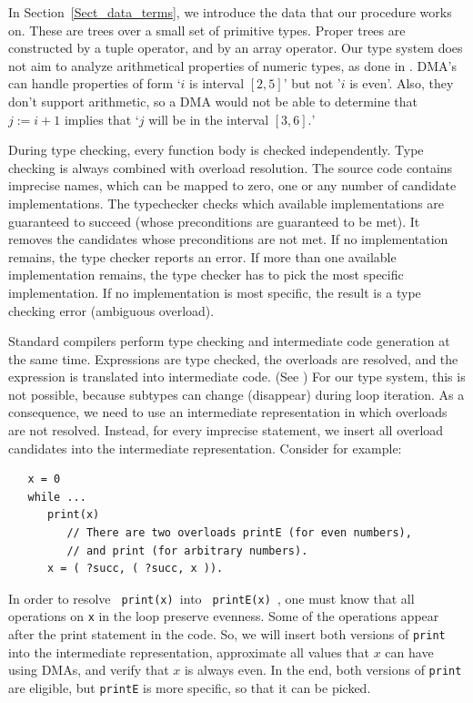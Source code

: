 In Section~\ref{Sect_data_terms}, we introduce the data 
that our procedure works on. These are trees over a small
set of primitive types. Proper trees are constructed by a tuple
operator, and by an array operator. 
Our type system does not aim to analyze arithmetical properties
of numeric types, as done in \cite{JhaVaz2021ref}. 
DMA's can handle properties of form `$i$ is interval $ [2,5] $'
but not '$i$ is even'. Also, they don't support arithmetic,
so a DMA would not be able to determine that $ j := i + 1 $ 
implies that `$j$ will be in the interval $ [3,6]. $' 

During type checking, every function body is checked independently.
Type checking is always combined with overload resolution. 
The source code contains imprecise names, which can be mapped
to zero, one or any number of candidate implementations.
The typechecker checks which available implementations are 
guaranteed to succeed (whose preconditions are guaranteed to be met).
It removes the candidates whose preconditions are not met. 
If no implementation remains, the type checker reports an error. 
If more than one available implementation remains, the type checker
has to pick the most specific implementation. If no implementation
is most specific, the result is a type checking error (ambiguous overload).

Standard compilers perform type checking and intermediate code generation
at the same time.
Expressions are type checked, the overloads are resolved, and the 
expression is translated into intermediate code. 
(See \cite{WiSe2023})
For our type system, this is not possible, because
subtypes can change (disappear)
during loop iteration. As a consequence, we need to
use an intermediate
representation in which overloads are not resolved. Instead, 
for every imprecise statement, we
insert all overload candidates into the intermediate representation. 
Consider for example:
\begin{verbatim}
   x = 0
   while ...
      print(x)
         // There are two overloads printE (for even numbers),
         // and print (for arbitrary numbers). 
      x = ( ?succ, ( ?succ, x )).
\end{verbatim}
In order to resolve \verb| print(x) |into \verb| printE(x) |, 
one must know that all
operations on \verb|x| in the loop preserve evenness.
Some of the operations appear after the print statement in the code.
So, we will insert both versions of \verb|print| into the 
intermediate representation,
approximate all values that $ x $ can have using DMAs, and verify
that $ x $ is always even. In the end, both versions of
\verb|print| are eligible, but \verb|printE| is more specific,
so that it can be picked. 

